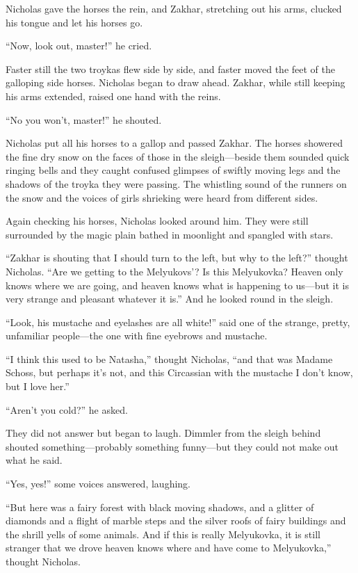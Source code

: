 Nicholas gave the horses the rein, and Zakhar, stretching out his
arms, clucked his tongue and let his horses go.

``Now, look out, master!'' he cried.

Faster still the two troykas flew side by side, and faster moved
the feet of the galloping side horses. Nicholas began to draw
ahead. Zakhar, while still keeping his arms extended, raised one
hand with the reins.

``No you won't, master!'' he shouted.

Nicholas put all his horses to a gallop and passed Zakhar. The
horses showered the fine dry snow on the faces of those in the
sleigh---beside them sounded quick ringing bells and they caught
confused glimpses of swiftly moving legs and the shadows of the
troyka they were passing. The whistling sound of the runners on
the snow and the voices of girls shrieking were heard from
different sides.

Again checking his horses, Nicholas looked around him. They were
still surrounded by the magic plain bathed in moonlight and
spangled with stars.

``Zakhar is shouting that I should turn to the left, but why to
the left?'' thought Nicholas. ``Are we getting to the Melyukovs'?
Is this Melyukovka? Heaven only knows where we are going, and
heaven knows what is happening to us---but it is very strange and
pleasant whatever it is.''  And he looked round in the sleigh.

``Look, his mustache and eyelashes are all white!'' said one of
the strange, pretty, unfamiliar people---the one with fine
eyebrows and mustache.

``I think this used to be Natasha,'' thought Nicholas, ``and that
was Madame Schoss, but perhaps it's not, and this Circassian with
the mustache I don't know, but I love her.''

``Aren't you cold?'' he asked.

They did not answer but began to laugh. Dimmler from the sleigh
behind shouted something---probably something funny---but they
could not make out what he said.

``Yes, yes!'' some voices answered, laughing.

``But here was a fairy forest with black moving shadows, and a
glitter of diamonds and a flight of marble steps and the silver
roofs of fairy buildings and the shrill yells of some
animals. And if this is really Melyukovka, it is still stranger
that we drove heaven knows where and have come to Melyukovka,''
thought Nicholas.

